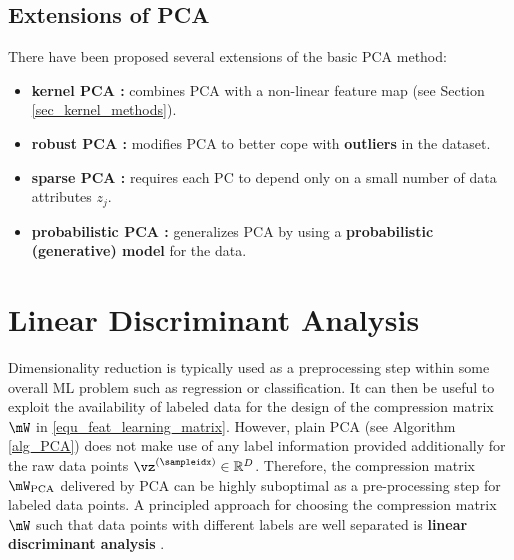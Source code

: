 \documentclass[12pt]{report}
\begin{document}
\subsection{Extensions of PCA}
There have been proposed several extensions of the basic PCA method: 
\begin{itemize}
 \item {\bf kernel PCA \cite[Ch.14.5.4]{hastie01statisticallearning}:} combines PCA with a non-linear feature map (see Section \ref{sec_kernel_methods}). %
 \vspace*{2mm}
 \item {\bf robust PCA \cite{RobustPCA}:} modifies PCA to better cope with {\bf outliers} in the dataset.
 \vspace*{2mm}
 \item {\bf sparse PCA \cite[Ch.14.5.5]{hastie01statisticallearning}:} requires each PC to depend only on a small number of data attributes $z_{j}$. 
 \vspace*{2mm}
 \item {\bf probabilistic PCA \cite{Roweis98emalgorithms,probabilistic-principal-component-analysis}:} generalizes PCA by using a  {\bf probabilistic (generative) model} for the data. 
\end{itemize}

\section{Linear Discriminant Analysis}

Dimensionality reduction is typically used as a preprocessing step within some overall ML problem such as 
regression or classification. It can then be useful to exploit the availability of labeled data for the design 
of the compression matrix $\mW$ in \eqref{equ_feat_learning_matrix}. However, plain PCA (see Algorithm 
\ref{alg_PCA}) does not make use of any label information provided additionally for the raw data points 
$\vz^{(\sampleidx)} \in \mathbb{R}^{D}$. Therefore, the compression matrix $\mW_{\rm PCA}$ delivered 
by PCA can be highly suboptimal as a pre-processing step for labeled data points. A principled approach 
for choosing the compression matrix $\mW$ such that data points with different labels are well separated 
is {\bf linear discriminant analysis} \cite{hastie01statisticallearning}. 
\end{document}
